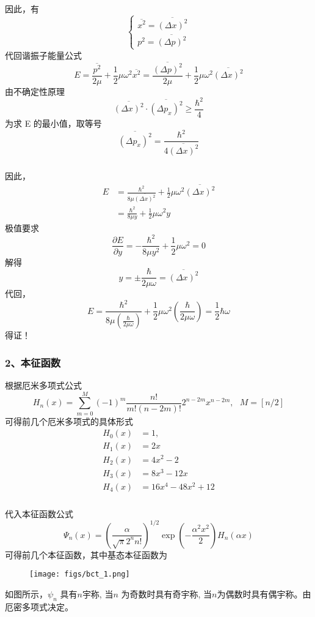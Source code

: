 \begin{frame}
  \frametitle{}
因此，有
$$
\left\{\begin{array}{l}
\overline{x^2}=\overline{(\Delta x)^2} \\
p^2=\overline{(\Delta p)^2}
\end{array}\right.
$$
  代回谐振子能量公式
  $$
  E=\frac{\overline{p^2}}{2 \mu}+\frac{1}{2} \mu \omega^2 \overline{x^2}=\overline{\frac{(\Delta p)^2}{2 \mu}}+\frac{1}{2} \mu \omega^2 \overline{(\Delta x)^2}
  $$
  由不确定性原理
  $$
\overline{(\Delta x)^2} \cdot \overline{\left(\Delta p_x\right)^2} \geq \frac{\hbar^2}{4}
$$
为求 E 的最小值，取等号
$$
\overline{\left(\Delta p_x\right)^2}=\frac{\hbar^2}{4 \overline{(\Delta x)^2}}
$$
\end{frame} 

\begin{frame}
  \frametitle{}
因此， 
$$
\begin{aligned}
    E&=\frac{\hbar^2}{8 \mu \overline{(\Delta x)^2}}+\frac{1}{2} \mu \omega^2 \overline{(\Delta x)^2} \\
    &=\frac{\hbar^2}{8 \mu y}+\frac{1}{2} \mu \omega^2 y
\end{aligned}
$$
极值要求
$$
\frac{\partial E}{\partial y}=-\frac{\hbar^2}{8 \mu y^2}+\frac{1}{2} \mu \omega^2 = 0
$$
解得 
$$
y=\pm \frac{\hbar}{2 \mu \omega}=\overline{(\Delta x)^2}
$$
代回，
$$
E=\frac{\hbar^2}{8 \mu\left(\frac{\hbar}{2 \mu \omega}\right)}+\frac{1}{2} \mu \omega^2\left(\frac{\hbar}{2 \mu \omega}\right)=\frac{1}{2} \hbar \omega
$$
得证！
\end{frame} 

\begin{frame}
  \frametitle{ 2、本征函数} 
  根据厄米多项式公式
  \begin{equation*}
    H_n(x) =\sum_{m=0}^{M}  (-1)^m \frac{n! } {  m ! (n-2m)!}  2^{n-2m} x^{n-2m} ,  ~~~ M=[n/2] 
\end{equation*}
可得前几个厄米多项式的具体形式
\[\begin{aligned} H_0 (x) &= 1,\\ H_1 (x) &= 2x \\ H_2 (x) &= 4x^2 -2 \\  H_3 (x) &= 8x^3 -12x \\ H_4 (x) &= 16x^4 -48x^2 +12 \end{aligned}\]
\end{frame} 

\begin{frame}
  \frametitle{}
  代入本征函数公式
  \begin{equation*}
	  \Psi_n(x) = \left( \frac{\alpha}{\sqrt{\pi} 2^n n!}  \right) ^{1/2}  \exp(-\frac{ \alpha^2 x^2}{2}) H_n( \alpha x) 
  \end{equation*}
  可得前几个本征函数，其中基态本征函数为 
  \begin{figure}[htbp]
	\centering
	\texttt{[image: figs/bct\_1.png]}
\end{figure} 
\emf[宇称: ] 如图所示，$\psi _n $ 具有$n$宇称, 当$n$
  为奇数时具有奇宇称, 当$n$为偶数时具有偶宇称。由厄密多项式决定。
\end{frame} 

